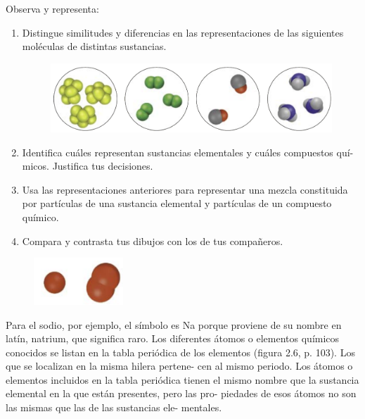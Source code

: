 \documentclass[11pt]{book}
\begin{document}
\begin{minipage}{\textwidth}
  \begin{boxK}
    Observa y representa:

    \begin{enumerate}
      \item Distingue similitudes y diferencias en las representaciones de las siguientes
            moléculas de distintas sustancias.

            \begin{figure}[H]
              \centering
              \includegraphics[width=.6\textwidth]{atomos05.png}
            \end{figure}

      \item Identifica cuáles representan sustancias elementales y cuáles compuestos quí-
            micos. Justifica tus decisiones.
      \item Usa las representaciones anteriores para representar una mezcla constituida por
            partículas de una sustancia elemental y partículas de un compuesto químico.
      \item Compara y contrasta tus dibujos con los de tus compañeros.
    \end{enumerate}
  \end{boxK}
\end{minipage}
\vspace{0.5cm}

\begin{figure}
  \centering
  \includegraphics[width=0.3\textwidth]{atomos07.png}
  \label{fig:atomos07}
\end{figure}

Para el sodio, por ejemplo, el símbolo es Na porque proviene de su nombre en latín, natrium, que significa raro.
Los diferentes átomos o elementos químicos conocidos se listan en la
tabla periódica de los elementos (figura 2.6, p. 103). Los que se localizan en la misma hilera pertene-
cen al mismo periodo. Los átomos o elementos incluidos en la tabla periódica tienen el mismo
nombre que la sustancia elemental en la que están presentes, pero las pro-
piedades de esos átomos no son las mismas que las de las sustancias ele-
mentales.\\
\end{document}
